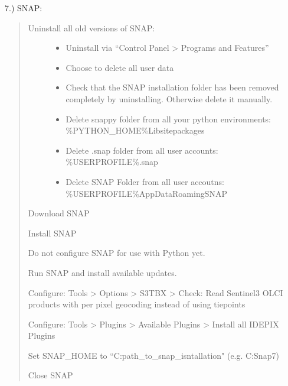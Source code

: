 \documentclass[letterpaper,10pt,english]{sphinxmanual}
\begin{document}
7.) SNAP: 
\begin{quote}
\begin{description}
\item[{Uninstall all old versions of SNAP:}] \leavevmode\begin{itemize}
\item {} 
Uninstall via “Control Panel \sphinxhyphen{}\textgreater{} Programs and Features”

\item {} 
Choose to delete all user data

\item {} 
Check that the SNAP installation folder has been removed completely by uninstalling. Otherwise delete it manually.

\item {} 
Delete snappy folder from all your python environments: \%PYTHON\_HOME\%Libsite\sphinxhyphen{}packages

\item {} 
Delete .snap folder from all user accounts: \%USERPROFILE\%.snap

\item {} 
Delete SNAP Folder from all user accoutns: \%USERPROFILE\%AppDataRoamingSNAP

\end{itemize}

\end{description}

Download SNAP

Install SNAP

Do not configure SNAP for use with Python yet.

Run SNAP and install available updates.

Configure: Tools \sphinxhyphen{}\textgreater{} Options \sphinxhyphen{}\textgreater{} S3TBX \sphinxhyphen{}\textgreater{} Check: Read Sentinel\sphinxhyphen{}3 OLCI products with per pixel geo\sphinxhyphen{}coding instead of using tie\sphinxhyphen{}points

Configure: Tools \sphinxhyphen{}\textgreater{} Plugins \sphinxhyphen{}\textgreater{} Available Plugins \sphinxhyphen{}\textgreater{} Install all IDEPIX Plugins

Set SNAP\_HOME to “C:path\_to\_snap\_isntallation" (e.g. C:Snap7)

Close SNAP
\end{quote}
\end{document}
